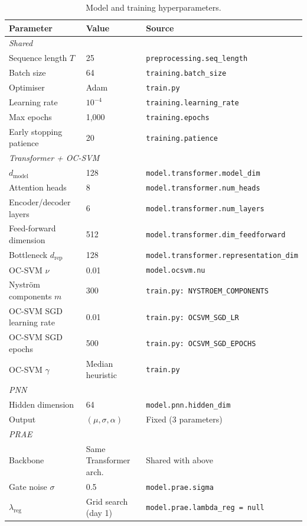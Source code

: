 \documentclass[11pt]{report}
\begin{document}
\begin{table}[H]
\centering
\caption{Model and training hyperparameters.}\label{tab:hyperparams}
\begin{tabular}{lll}
\toprule
\textbf{Parameter} & \textbf{Value} & \textbf{Source} \\
\midrule
\multicolumn{3}{l}{\textit{Shared}} \\
Sequence length $T$ & 25 & \texttt{preprocessing.seq\_length} \\
Batch size & 64 & \texttt{training.batch\_size} \\
Optimiser & Adam & \texttt{train.py} \\
Learning rate & $10^{-4}$ & \texttt{training.learning\_rate} \\
Max epochs & 1{,}000 & \texttt{training.epochs} \\
Early stopping patience & 20 & \texttt{training.patience} \\
\midrule
\multicolumn{3}{l}{\textit{Transformer + OC-SVM}} \\
$d_{\text{model}}$ & 128 & \texttt{model.transformer.model\_dim} \\
Attention heads & 8 & \texttt{model.transformer.num\_heads} \\
Encoder/decoder layers & 6 & \texttt{model.transformer.num\_layers} \\
Feed-forward dimension & 512 & \texttt{model.transformer.dim\_feedforward} \\
Bottleneck $d_{\text{rep}}$ & 128 & \texttt{model.transformer.representation\_dim} \\
OC-SVM $\nu$ & 0.01 & \texttt{model.ocsvm.nu} \\
Nystr\"om components $m$ & 300 & \texttt{train.py: NYSTROEM\_COMPONENTS} \\
OC-SVM SGD learning rate & 0.01 & \texttt{train.py: OCSVM\_SGD\_LR} \\
OC-SVM SGD epochs & 500 & \texttt{train.py: OCSVM\_SGD\_EPOCHS} \\
OC-SVM $\gamma$ & Median heuristic & \texttt{train.py} \\
\midrule
\multicolumn{3}{l}{\textit{PNN}} \\
Hidden dimension & 64 & \texttt{model.pnn.hidden\_dim} \\
Output & $(\mu, \sigma, \alpha)$ & Fixed (3 parameters) \\
\midrule
\multicolumn{3}{l}{\textit{PRAE}} \\
Backbone & Same Transformer arch. & Shared with above \\
Gate noise $\sigma$ & 0.5 & \texttt{model.prae.sigma} \\
$\lambda_{\text{reg}}$ & Grid search (day 1) & \texttt{model.prae.lambda\_reg = null} \\
\bottomrule
\end{tabular}
\end{table}
\end{document}

